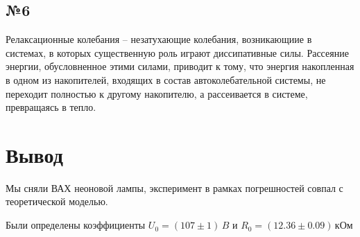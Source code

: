 \subsection{№6}

Релаксационные колебания -- незатухающие колебания, возникающиие в системах, в которых существенную роль играют диссипативные силы. Рассеяние энергии, обусловненное этими силами, приводит к тому, что энергия  накопленная в одном из накопителей, входящих в состав автоколебательной системы, не переходит полностью к другому накопителю, а рассеивается в системе, превращаясь в тепло.

\newpage
\section{Вывод}
Мы сняли ВАХ неоновой лампы, эксперимент в рамках погрешностей совпал с теоретической моделью. 

Были определены коэффициенты $U_0=(107\pm 1)\,B$ и $R_0=(12.36\pm 0.09)\,\text{кОм}$




